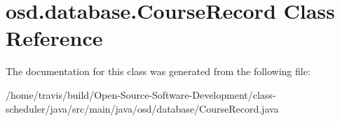 \hypertarget{classosd_1_1database_1_1_course_record}{\section{osd.\-database.\-Course\-Record Class Reference}
\label{classosd_1_1database_1_1_course_record}
}


The documentation for this class was generated from the following file\-:\begin{DoxyCompactItemize}
\item 
/home/travis/build/\-Open-\/\-Source-\/\-Software-\/\-Development/class-\/scheduler/java/src/main/java/osd/database/Course\-Record.\-java\end{DoxyCompactItemize}
